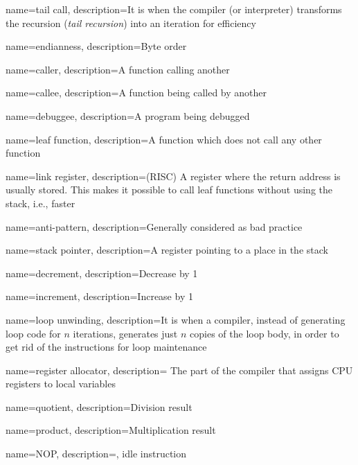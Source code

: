 {
  name=tail call,
  description={It is when the compiler (or interpreter) transforms the recursion
  (\emph{tail recursion}) into an iteration for efficiency}
}

{
  name=endianness,
  description={Byte order}
}

{
  name=caller,
  description={A function calling another}
}

{
  name=callee,
  description={A function being called by another}
}

{
  name=debuggee,
  description={A program being debugged}
}

{
  name=leaf function,
  description={A function which does not call any other function}
}

{
  name=link register,
  description=(RISC) {A register where the return address is usually stored.
  This makes it possible to call leaf functions without using the stack, i.e., faster}
}

{
  name=anti-pattern,
  description={Generally considered as bad practice}
}

{
  name=stack pointer,
  description={A register pointing to a place in the stack}
}

{
  name=decrement,
  description={Decrease by 1}
}

{
  name=increment,
  description={Increase by 1}
}

{
  name=loop unwinding,
  description={It is when a compiler, instead of generating loop code for $n$ iterations, generates just $n$ copies of the
  loop body, in order to get rid of the instructions for loop maintenance}
}

{
  name=register allocator,
  description=
  {The part of the compiler that assigns CPU registers to local variables}
}

{
  name=quotient,
  description={Division result}
}

{
  name=product,
  description={Multiplication result}
}

{
  name=NOP,
  description={, idle instruction}
}

